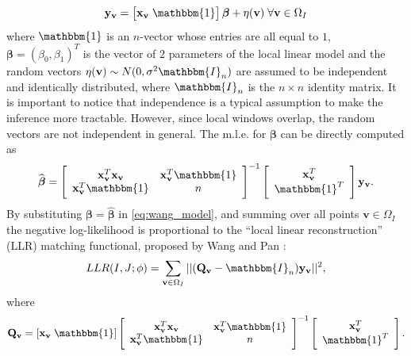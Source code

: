 \begin{equation}\label{eq:wang_model}
    \mathbf{y}_{\mathbf{v}} = \left[\mathbf{x}_{\mathbf{v}} \; \mathbbm{1}\right]\boldsymbol{\beta} + \eta(\mathbf{v}) \; \forall \mathbf{v}\in\Omega_{I}
\end{equation}
where $\mathbbm{1}$ is an $n$-vector whose entries are all equal to $1$,  \hbox{$\boldsymbol{\beta} = (\beta_{0}, \beta_{1})^{T}$} is the vector of $2$ parameters of the local linear model and the random vectors $\eta(\mathbf{v})\sim N(0, \sigma^{2} \mathbbm{I}_{n})$ are assumed to be independent and identically distributed, where $\mathbbm{I}_{n}$ is the $n \times n$ identity matrix. It is important to notice that independence is a typical assumption to make the inference more tractable. However, since local windows overlap, the random vectors are not independent in general. The m.l.e. for $\boldsymbol{\beta}$ can be directly computed as
\begin{equation}\label{eq:wang_model_mle_beta}
    \widehat{\boldsymbol{\beta}} =
    \left[\begin{array}{cc}
        \mathbf{x}_{\mathbf{v}}^{T}\mathbf{x}_{\mathbf{v}} & \mathbf{x}_{\mathbf{v}}^{T}\mathbbm{1}\\
        \mathbf{x}_{\mathbf{v}}^{T}\mathbbm{1} & n
    \end{array}\right]^{-1}
    \left[\begin{array}{c}
        \mathbf{x}_{\mathbf{v}}^{T}\\
        \mathbbm{1}^{T}
    \end{array}\right]\mathbf{y}_{\mathbf{v}}.
\end{equation}
By substituting $\boldsymbol{\beta} = \widehat{\boldsymbol{\beta}}$ in \eqref{eq:wang_model}, and summing over all points $\mathbf{v} \in\Omega_{I}$ the negative log-likelihood is proportional to the ``local linear reconstruction'' (LLR) matching functional, proposed by Wang and Pan \cite{Wang2014}:
\begin{equation}\label{eq:wang_metric}
    LLR(I, J;\phi) = \sum_{\mathbf{v} \in\Omega_{I}}|| (\mathbf{Q}_{\mathbf{v}} - \mathbbm{I}_{n})\mathbf{y}_{\mathbf{v}}||^{2},
\end{equation}
\vspace{-0.2cm}
where
\vspace{-0.2cm}
\begin{equation}\label{eq:def_P_v}
    \mathbf{Q_v} = [\mathbf{x}_{\mathbf{v}} \; \mathbbm{1}]
    \left[\begin{array}{cc}
        \mathbf{x}_{\mathbf{v}}^{T}\mathbf{x}_{\mathbf{v}} & \mathbf{x}_{\mathbf{v}}^{T}\mathbbm{1}\\
        \mathbf{x}_{\mathbf{v}}^{T}\mathbbm{1} & n
    \end{array}\right]^{-1}
    \left[\begin{array}{c}
        \mathbf{x}_{\mathbf{v}}^{T}\\
        \mathbbm{1}^{T}
    \end{array}\right].
\end{equation}

